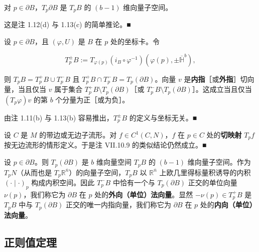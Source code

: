 \begin{remark}

\begin{items}
\item

对 $ p \in \partial B $，$ T_p\partial B $ 是 $ T_pB $ 的 $ (b-1) $ 维向量子空间。

\proofhead
这是注 1.12(d) 与 1.13(c) 的简单推论。\nobreak\hspace{0.35em}■
\item

设 $ p \in \partial B $，且 $ (\varphi,U) $ 是 $ B $ 在 $ p $ 处的坐标卡。令

\[
T_p^{\pm}B := T_{\varphi(p)}(i_B\circ\varphi^{-1})(\varphi(p), \pm\overline{\mathbb{H}}^b) ,
\]

则 $ T_pB = T_p^{+}B\cup T_p^{-}B $ 且 $ T_p^{+}B\cap T_p^{-}B = T_p(\partial B) $。向量 $ v $ 是\textbf{内指}［或\textbf{外指}］切向量，当且仅当 $ v $ 属于集合 $ T_p^{+}B\setminus T_p(\partial B) $［或 $ T_p^{-}B\setminus T_p(\partial B) $］。这成立当且仅当 $ (T_p\varphi)v $ 的第 $ b $ 个分量为正［或为负］。

\proofhead
由注 1.11(b) 与 1.13(b) 容易推出，$ T_p^{\pm}B $ 的定义与坐标无关。\nobreak\hspace{0.35em}■
\item

设 $ C $ 是 $ M $ 的带边或无边子流形。对 $ f \in C^1(C,N) $，$ f $ 在 $ p \in C $ 处的\textbf{切映射} $ T_pf $ 按无边流形的情形定义。于是注 VII.10.9 的类似结论仍然成立。\nobreak\hspace{0.35em}■

\end{items}

设 $ p \in \partial B $。则 $ T_{p}(\partial B) $ 是 $ b $ 维向量空间 $ T_{p}B $ 的 $ (b-1) $ 维向量子空间。作为 $ T_{p}N $（从而也是 $ T_{p}\mathbb{R}^{\overline{n}} $）的向量子空间，$ T_{p}B $ 以 $ \mathbb{R}^{\overline{n}} $ 上欧几里得标量积诱导的内积 $ (\cdot \mid \cdot)_{p} $ 构成内积空间。因此 $ T_{p}^{-}B $ 中恰有一个与 $ T_{p}(\partial B) $ 正交的单位向量 $ \nu(p) $，我们称它为 $ \partial B $ 在 $ p $ 处的\textbf{外向（单位）法向量}。显然 $ -\nu(p) \in T_{p}^{+}B $ 是 $ T_{p}B $ 中与 $ T_{p}(\partial B) $ 正交的唯一内指向量，我们称它为 $ \partial B $ 在 $ p $ 处的\textbf{内向（单位）法向量}。

\end{remark}

\subsection*{正则值定理}

